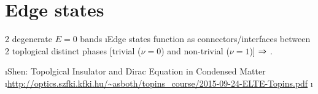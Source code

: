 \section{Edge states}
\alert{2 degenerate $E=0$ bands} 
\bi
\i Edge states function as connectors/interfaces between 2 toplogical distinct phases
[trivial ($\nu=0$) and non-trivial ($\nu=1$)] $\Rightarrow$ .
\ei

\bnu
 \i Shen: Topolgical Insulator and Dirac Equation in Condensed Matter
\i \url{http://optics.szfki.kfki.hu/~asboth/topins_course/2015-09-24-ELTE-Topins.pdf}
\i %
 \enu





